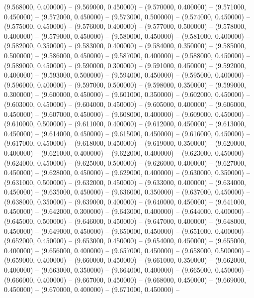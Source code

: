 (9.568000, 0.400000) -- 
(9.569000, 0.450000) -- 
(9.570000, 0.400000) -- 
(9.571000, 0.450000) -- 
(9.572000, 0.450000) -- 
(9.573000, 0.500000) -- 
(9.574000, 0.450000) -- 
(9.575000, 0.450000) -- 
(9.576000, 0.400000) -- 
(9.577000, 0.500000) -- 
(9.578000, 0.400000) -- 
(9.579000, 0.450000) -- 
(9.580000, 0.450000) -- 
(9.581000, 0.400000) -- 
(9.582000, 0.350000) -- 
(9.583000, 0.400000) -- 
(9.584000, 0.350000) -- 
(9.585000, 0.500000) -- 
(9.586000, 0.450000) -- 
(9.587000, 0.400000) -- 
(9.588000, 0.450000) -- 
(9.589000, 0.450000) -- 
(9.590000, 0.300000) -- 
(9.591000, 0.450000) -- 
(9.592000, 0.400000) -- 
(9.593000, 0.500000) -- 
(9.594000, 0.450000) -- 
(9.595000, 0.400000) -- 
(9.596000, 0.400000) -- 
(9.597000, 0.500000) -- 
(9.598000, 0.350000) -- 
(9.599000, 0.300000) -- 
(9.600000, 0.450000) -- 
(9.601000, 0.350000) -- 
(9.602000, 0.450000) -- 
(9.603000, 0.450000) -- 
(9.604000, 0.450000) -- 
(9.605000, 0.400000) -- 
(9.606000, 0.450000) -- 
(9.607000, 0.450000) -- 
(9.608000, 0.400000) -- 
(9.609000, 0.450000) -- 
(9.610000, 0.500000) -- 
(9.611000, 0.400000) -- 
(9.612000, 0.450000) -- 
(9.613000, 0.450000) -- 
(9.614000, 0.450000) -- 
(9.615000, 0.450000) -- 
(9.616000, 0.450000) -- 
(9.617000, 0.450000) -- 
(9.618000, 0.450000) -- 
(9.619000, 0.350000) -- 
(9.620000, 0.400000) -- 
(9.621000, 0.400000) -- 
(9.622000, 0.400000) -- 
(9.623000, 0.450000) -- 
(9.624000, 0.450000) -- 
(9.625000, 0.500000) -- 
(9.626000, 0.400000) -- 
(9.627000, 0.450000) -- 
(9.628000, 0.450000) -- 
(9.629000, 0.400000) -- 
(9.630000, 0.350000) -- 
(9.631000, 0.500000) -- 
(9.632000, 0.450000) -- 
(9.633000, 0.400000) -- 
(9.634000, 0.450000) -- 
(9.635000, 0.450000) -- 
(9.636000, 0.350000) -- 
(9.637000, 0.450000) -- 
(9.638000, 0.350000) -- 
(9.639000, 0.400000) -- 
(9.640000, 0.450000) -- 
(9.641000, 0.450000) -- 
(9.642000, 0.300000) -- 
(9.643000, 0.400000) -- 
(9.644000, 0.400000) -- 
(9.645000, 0.500000) -- 
(9.646000, 0.450000) -- 
(9.647000, 0.400000) -- 
(9.648000, 0.450000) -- 
(9.649000, 0.450000) -- 
(9.650000, 0.450000) -- 
(9.651000, 0.400000) -- 
(9.652000, 0.450000) -- 
(9.653000, 0.450000) -- 
(9.654000, 0.450000) -- 
(9.655000, 0.400000) -- 
(9.656000, 0.400000) -- 
(9.657000, 0.450000) -- 
(9.658000, 0.500000) -- 
(9.659000, 0.400000) -- 
(9.660000, 0.450000) -- 
(9.661000, 0.350000) -- 
(9.662000, 0.400000) -- 
(9.663000, 0.350000) -- 
(9.664000, 0.400000) -- 
(9.665000, 0.450000) -- 
(9.666000, 0.400000) -- 
(9.667000, 0.450000) -- 
(9.668000, 0.450000) -- 
(9.669000, 0.450000) -- 
(9.670000, 0.400000) -- 
(9.671000, 0.450000) -- 
